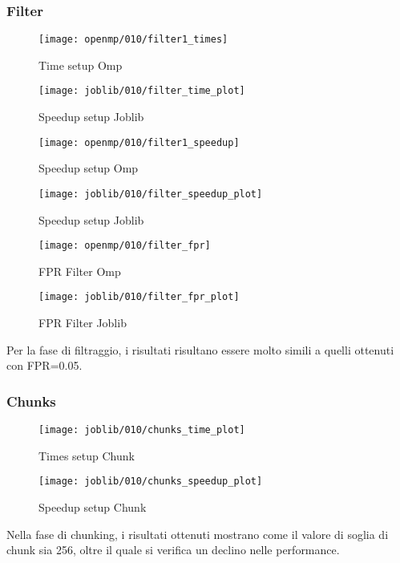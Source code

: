 \subsubsection{Filter}\label{subsubsec:fpr-010-filter}
\begin{figure}[H]
    \centering
    \texttt{[image: openmp/010/filter1\_times]}
        \caption{Time setup Omp}\label{fig:010-filter_time_omp}
    \endminipage\hfill
    \texttt{[image: joblib/010/filter\_time\_plot]}
        \caption{Speedup setup Joblib}\label{fig:010-filter_time_joblib}
    \endminipage\hfill
\end{figure}
\begin{figure}[H]
    \centering
    \texttt{[image: openmp/010/filter1\_speedup]}
        \caption{Speedup setup Omp}\label{fig:010-filter_speedup_omp}
    \endminipage\hfill
    \texttt{[image: joblib/010/filter\_speedup\_plot]}
        \caption{Speedup setup Joblib}\label{fig:010-filter_speedup_joblib}
    \endminipage\hfill
\end{figure}
\begin{figure}[H]
    \centering
    \texttt{[image: openmp/010/filter\_fpr]}
        \caption{FPR Filter Omp}\label{fig:010-filter_fpr_omp}
    \endminipage\hfill
    \texttt{[image: joblib/010/filter\_fpr\_plot]}
        \caption{FPR Filter Joblib}\label{fig:010-filter_fpr_joblib}
    \endminipage\hfill
\end{figure}

Per la fase di filtraggio, i risultati risultano essere molto simili a quelli ottenuti con FPR=0.05.

\subsubsection{Chunks}\label{subsubsec:010-chunks}
\begin{figure}[H]
    \centering
    \texttt{[image: joblib/010/chunks\_time\_plot]}
        \caption{Times setup Chunk}\label{fig:010-chunks_time}
    \endminipage\hfill
    \texttt{[image: joblib/010/chunks\_speedup\_plot]}
        \caption{Speedup setup Chunk}\label{fig:010-chunks_speedup}
    \endminipage\hfill
\end{figure}

Nella fase di chunking, i risultati ottenuti mostrano come il valore di soglia di chunk sia 256, oltre il quale si
verifica un declino nelle performance.


